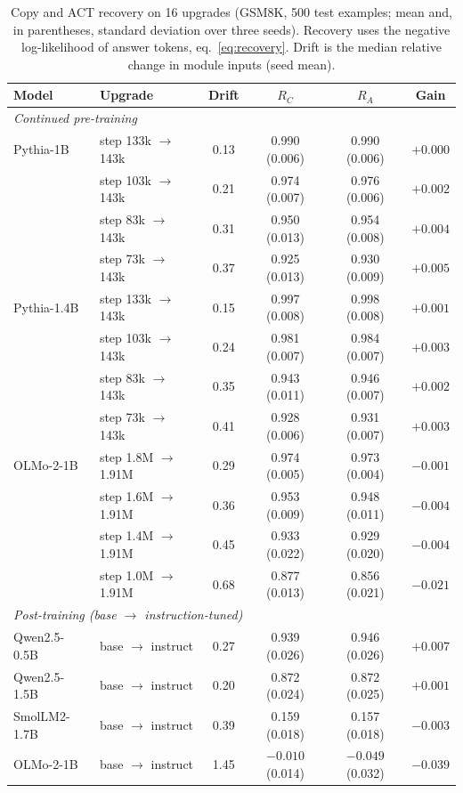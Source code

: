 \documentclass[ijds,blindrev]{informs4}
\begin{document}
\begin{table}[t]
\centering
\caption{Copy and ACT recovery on 16 upgrades (GSM8K, 500 test examples; mean and, in parentheses, standard deviation over three seeds). Recovery uses the negative log-likelihood of answer tokens, eq.~\eqref{eq:recovery}. Drift is the median relative change in module inputs (seed mean).}\label{tab:pairs}
\small
\begin{tabular}{llcccc}
\toprule
Model & Upgrade & Drift & $R_C$ & $R_A$ & Gain\\
\midrule
\multicolumn{6}{l}{\emph{Continued pre-training}}\\
Pythia-1B & step 133k $\to$ 143k & 0.13 & 0.990 (0.006) & 0.990 (0.006) & $+0.000$\\
 & step 103k $\to$ 143k & 0.21 & 0.974 (0.007) & 0.976 (0.006) & $+0.002$\\
 & step 83k $\to$ 143k & 0.31 & 0.950 (0.013) & 0.954 (0.008) & $+0.004$\\
 & step 73k $\to$ 143k & 0.37 & 0.925 (0.013) & 0.930 (0.009) & $+0.005$\\
Pythia-1.4B & step 133k $\to$ 143k & 0.15 & 0.997 (0.008) & 0.998 (0.008) & $+0.001$\\
 & step 103k $\to$ 143k & 0.24 & 0.981 (0.007) & 0.984 (0.007) & $+0.003$\\
 & step 83k $\to$ 143k & 0.35 & 0.943 (0.011) & 0.946 (0.007) & $+0.002$\\
 & step 73k $\to$ 143k & 0.41 & 0.928 (0.006) & 0.931 (0.007) & $+0.003$\\
OLMo-2-1B & step 1.8M $\to$ 1.91M & 0.29 & 0.974 (0.005) & 0.973 (0.004) & $-0.001$\\
 & step 1.6M $\to$ 1.91M & 0.36 & 0.953 (0.009) & 0.948 (0.011) & $-0.004$\\
 & step 1.4M $\to$ 1.91M & 0.45 & 0.933 (0.022) & 0.929 (0.020) & $-0.004$\\
 & step 1.0M $\to$ 1.91M & 0.68 & 0.877 (0.013) & 0.856 (0.021) & $-0.021$\\
\multicolumn{6}{l}{\emph{Post-training (base $\to$ instruction-tuned)}}\\
Qwen2.5-0.5B & base $\to$ instruct & 0.27 & 0.939 (0.026) & 0.946 (0.026) & $+0.007$\\
Qwen2.5-1.5B & base $\to$ instruct & 0.20 & 0.872 (0.024) & 0.872 (0.025) & $+0.001$\\
SmolLM2-1.7B & base $\to$ instruct & 0.39 & 0.159 (0.018) & 0.157 (0.018) & $-0.003$\\
OLMo-2-1B & base $\to$ instruct & 1.45 & $-0.010$ (0.014) & $-0.049$ (0.032) & $-0.039$\\
\bottomrule
\end{tabular}
\end{table}
\end{document}
